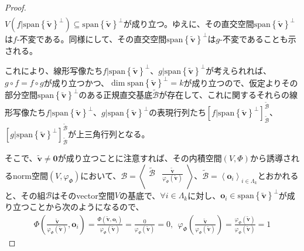 \documentclass[dvipdfmx]{jsarticle}
\begin{document}
\begin{proof}
\begin{align*}
\end{align*}
$V\left( f|{{\mathrm{span}}\left\{ \widetilde{\mathbf{v}} \right\}}^{\bot} \right) \subseteq {{\mathrm{span}}\left\{ \widetilde{\mathbf{v}} \right\}}^{\bot}$が成り立つ。ゆえに、その直交空間${{\mathrm{span}}\left\{ \widetilde{\mathbf{v}} \right\}}^{\bot}$は$f$-不変である。同様にして、その直交空間${{\mathrm{span}}\left\{ \widetilde{\mathbf{v}} \right\}}^{\bot}$は$g$-不変であることも示される。\par
これにより、線形写像たち$f|{{\mathrm{span}}\left\{ \widetilde{\mathbf{v}} \right\}}^{\bot}$、$g|{{\mathrm{span}}\left\{ \widetilde{\mathbf{v}} \right\}}^{\bot}$が考えられれば、$g \circ f = f \circ g$が成り立つかつ、$\dim{{\mathrm{span}}\left\{ \widetilde{\mathbf{v}} \right\}}^{\bot} = k$が成り立つので、仮定よりその部分空間${{\mathrm{span}}\left\{ \widetilde{\mathbf{v}} \right\}}^{\bot}$のある正規直交基底$\widetilde{\mathcal{B}}$が存在して、これに関するそれらの線形写像たち$f|{{\mathrm{span}}\left\{ \widetilde{\mathbf{v}} \right\}}^{\bot}$、$g|{{\mathrm{span}}\left\{ \widetilde{\mathbf{v}} \right\}}^{\bot}$の表現行列たち$\left[ f|{{\mathrm{span}}\left\{ \widetilde{\mathbf{v}} \right\}}^{\bot} \right]_{\widetilde{\mathcal{B}}}^{\widetilde{\mathcal{B}}}$、$\left[ g|{{\mathrm{span}}\left\{ \widetilde{\mathbf{v}} \right\}}^{\bot} \right]_{\widetilde{\mathcal{B}}}^{\widetilde{\mathcal{B}}}$が上三角行列となる。\par
そこで、$\widetilde{\mathbf{v}} \neq \mathbf{0}$が成り立つことに注意すれば、その内積空間$(V,\varPhi)$から誘導されるnorm空間$\left( V,\varphi_{\varPhi} \right)$において、$\mathcal{B} =\left\langle \begin{matrix}
\widetilde{\mathcal{B}} & \frac{\widetilde{\mathbf{v}}}{\varphi_{\varPhi}\left( \widetilde{\mathbf{v}} \right)} \\
\end{matrix} \right\rangle$、$\widetilde{\mathcal{B}} = \left\langle \mathbf{o}_{i} \right\rangle_{i \in \varLambda_{k}}$とおかれると、その組$\mathcal{B}$はそのvector空間$V$の基底で、$\forall i \in \varLambda_{k}$に対し、$\mathbf{o}_{i} \in {{\mathrm{span}}\left\{ \widetilde{\mathbf{v}} \right\}}^{\bot}$が成り立つことから次のようになるので、
\begin{align*}
\varPhi\left( \frac{\widetilde{\mathbf{v}}}{\varphi_{\varPhi}\left( \widetilde{\mathbf{v}} \right)},\mathbf{o}_{i} \right) = \frac{\varPhi\left( \widetilde{\mathbf{v}},\mathbf{o}_{i} \right)}{\varphi_{\varPhi}\left( \widetilde{\mathbf{v}} \right)} = \frac{0}{\varphi_{\varPhi}\left( \widetilde{\mathbf{v}} \right)} = 0,\ \ \varphi_{\varPhi}\left( \frac{\widetilde{\mathbf{v}}}{\varphi_{\varPhi}\left( \widetilde{\mathbf{v}} \right)} \right) = \frac{\varphi_{\varPhi}\left( \widetilde{\mathbf{v}} \right)}{\varphi_{\varPhi}\left( \widetilde{\mathbf{v}} \right)} = 1

\end{align*}
\end{proof}
\end{document}
